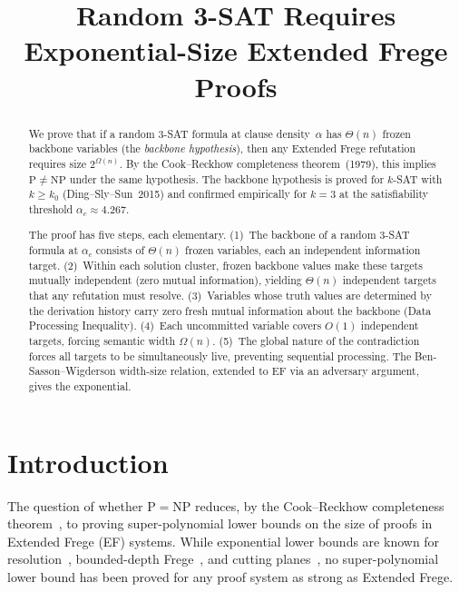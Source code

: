 \documentclass[11pt]{article}
\title{Random 3-SAT Requires Exponential-Size Extended Frege Proofs}
\author{}
\date{}
\theoremstyle{definition}
\begin{document}
\maketitle

\begin{abstract}
We prove that if a random 3-SAT formula at clause density~$\alpha$
has $\Theta(n)$ frozen backbone variables (the \emph{backbone
hypothesis}), then any Extended Frege refutation requires size
$2^{\Omega(n)}$.  By the Cook--Reckhow completeness
theorem~(1979), this implies
$\mathrm{P} \neq \mathrm{NP}$ under the same hypothesis.
The backbone hypothesis is proved for $k$-SAT with $k \geq k_0$
(Ding--Sly--Sun~2015) and confirmed empirically for $k = 3$ at the
satisfiability threshold $\alpha_c \approx 4.267$.

The proof has five steps, each elementary.
(1)~The backbone of a random 3-SAT formula at $\alpha_c$ consists of
$\Theta(n)$ frozen variables, each an independent information target.
(2)~Within each solution cluster, frozen backbone values make these
targets mutually independent (zero mutual information), yielding
$\Theta(n)$ independent targets that any refutation must resolve.
(3)~Variables whose truth values are determined by the derivation history
carry zero fresh mutual information about the backbone (Data Processing
Inequality).
(4)~Each uncommitted variable covers $O(1)$ independent targets, forcing
semantic width $\Omega(n)$.
(5)~The global nature of the contradiction forces all targets to be
simultaneously live, preventing sequential processing.
The Ben-Sasson--Wigderson width-size relation, extended to EF via an
adversary argument, gives the exponential.
\end{abstract}

\section{Introduction}\label{sec:intro}

The question of whether $\mathrm{P} = \mathrm{NP}$ reduces, by
the Cook--Reckhow completeness theorem~\cite{Cook1979}, to proving
super-polynomial lower bounds on the size of proofs in Extended Frege
(EF) systems.  While
exponential lower bounds are known for resolution~\cite{BenSasson2001,Chvatal1988},
bounded-depth Frege~\cite{Ajtai1988}, and cutting
planes~\cite{Pudlak1997}, no super-polynomial lower bound has been
proved for any proof system as strong as Extended Frege.
\end{document}
